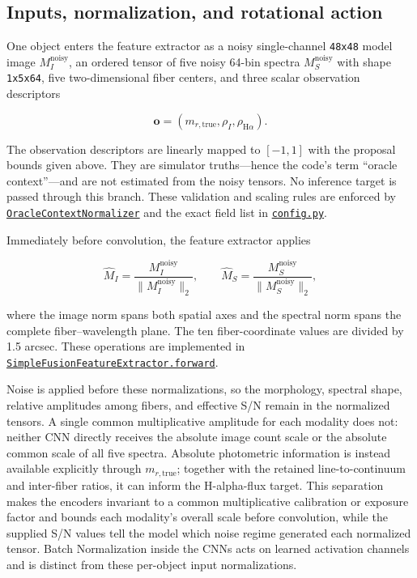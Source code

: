 \documentclass[11pt]{article}
\newcommand{\code}[1]{\nolinkurl{#1}}
\begin{document}
\subsection{Inputs, normalization, and rotational action}

One object enters the feature extractor as a noisy single-channel
\code{48x48} model image \(M_I^\mathrm{noisy}\), an ordered tensor of five noisy
64-bin spectra \(M_S^\mathrm{noisy}\) with shape \code{1x5x64}, five
two-dimensional fiber centers, and three scalar observation descriptors

\[
\mathbf o=
(m_{r,\mathrm{true}},\rho_I,\rho_{\mathrm{H}\alpha}).
\]

The observation descriptors are linearly mapped to \([-1,1]\) with the
proposal bounds given above. They are simulator truths—hence the code's term
“oracle context”—and are not estimated from the noisy tensors. No inference
target is passed through this branch. These validation and scaling rules are
enforced by \href{../arch/networks.py}{\code{OracleContextNormalizer}} and the exact
field list in \href{../arch/config.py}{\code{config.py}}.

Immediately before convolution, the feature extractor applies

\[
\widehat M_I
=\frac{M_I^\mathrm{noisy}}{\lVert M_I^\mathrm{noisy}\rVert_2},
\qquad
\widehat M_S
=\frac{M_S^\mathrm{noisy}}{\lVert M_S^\mathrm{noisy}\rVert_2},
\]

where the image norm spans both spatial axes and the spectral norm spans the
complete fiber--wavelength plane. The ten fiber-coordinate values are divided
by 1.5 arcsec. These operations are implemented in
\href{../arch/networks.py}{\code{SimpleFusionFeatureExtractor.forward}}.

Noise is applied before these normalizations, so the morphology, spectral
shape, relative amplitudes among fibers, and effective S/N remain in the
normalized tensors. A single common multiplicative amplitude for each modality
does not: neither CNN directly receives the absolute image count scale or the
absolute common scale of all five spectra. Absolute photometric information is
instead available explicitly through \(m_{r,\mathrm{true}}\); together with
the retained line-to-continuum and inter-fiber ratios, it can inform the
H-alpha-flux target. This separation makes the encoders invariant to a common
multiplicative calibration or exposure factor and bounds each modality's
overall scale before convolution, while the supplied S/N values tell the model which noise regime
generated each normalized tensor. Batch Normalization inside the CNNs acts on
learned activation channels and is distinct from these per-object input
normalizations.
\end{document}
